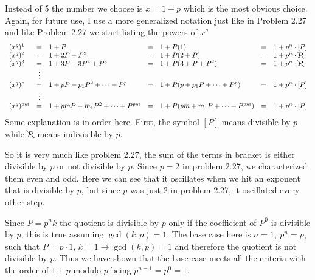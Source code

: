 \documentclass[aps,preprint,preprintnumbers,nofootinbib,showpacs,prd]{revtex4-1}
\newcommand{\nbea}{\begin{eqnarray*}}
\newcommand{\neea}{\end{eqnarray*}}
\begin{document}
Instead of 5 the number we choose is $x = 1+p$ which is the most obvious choice. Again, for future use, I use a more generalized notation just like in Problem 2.27 and like Problem 2.27 we start listing the powers of $x^q$
%
\nbea
\begin{array} {l c l c l c l}
(x^{q})^1 & = & 1 + P & = & 1 + P(1) & = & 1 + p^n \cdot [P] \\
(x^{q})^2 & = & 1 + 2P + P^2 & = & 1 + P(2 + P) & = & 1 + p^n \cdot \bcancel{P} \\
(x^{q})^3 & = & 1 + 3P + 3P^2 + P^3 & = & 1 + P(3 + P + P^2) & = & 1 + p^n \cdot \bcancel{P} \\
& \vdots & & & & & \\
(x^{q})^p & = & 1 + pP + p_1P^2 + \dots + P^p & = & 1 + P(p + p_1P + \dots + P^p) & = & 1 + p^n \cdot [P] \\
& \vdots & & & & & \\
(x^{q})^{pm} & = & 1 + pmP + m_1P^2 + \dots + P^{pm} & = & 1 + P(pm + m_1P + \dots + P^{pm}) & = &  1 + p^n \cdot [P]
\end{array}
\neea
%
Some explanation is in order here. First, the symbol $[P]$ means divisible by $p$ while $\bcancel{P}$ means indivisible by $p$.

So it is very much like problem 2.27, the sum of the terms in bracket is either divisible by $p$ or not divisible by $p$. Since $p=2$ in problem 2.27, we characterized them even and odd. Here we can see that it oscillates when we hit an exponent that is divisible by $p$, but since $p$ was just 2 in problem 2.27, it oscillated every other step.

Since $P = p^n k$ the quotient is divisible by $p$ only if the coefficient of $P^0$ is divisible by $p$, this is true assuming $\gcd(k,p) = 1$. The base case here is $n=1, ~p^n=p$, such that $P = p \cdot 1$, $k=1 \to \gcd(k,p) = 1$ and therefore the quotient is not divisible by $p$. Thus we have shown that the base case meets all the criteria with the order of $1+p$ modulo $p$ being $p^{n-1} = p^0 = 1$.
\end{document}
